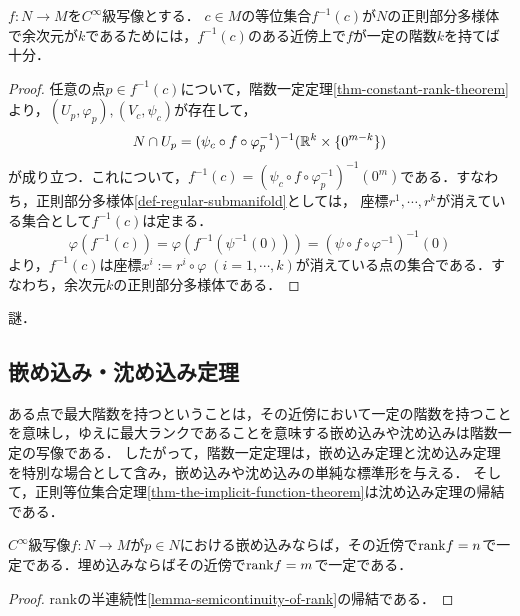 \documentclass[uplatex,dvipdfmx]{jsreport}
\begin{document}
\begin{theorem}\label{thm-constant-rank-level-set-theorem}
    $f:N\to M$を$C^\infty$級写像とする．
    $c\in M$の等位集合$f^{-1}(c)$が$N$の正則部分多様体で余次元が$k$であるためには，$f^{-1}(c)$のある近傍上で$f$が一定の階数$k$を持てば十分．
\end{theorem}
\begin{proof}
    任意の点$p\in f^{-1}(c)$について，階数一定定理\ref{thm-constant-rank-theorem}より，$(U_p,\varphi_p),(V_c,\psi_c)$が存在して，
    \[N\cap U_p=(\psi_c\circ f\circ\varphi_p^{-1})^{-1}(\mathbb{R}^k\times\{0^{m-k}\})\]
    が成り立つ．これについて，$f^{-1}(c)=(\psi_c\circ f\circ\varphi_p^{-1})^{-1}(0^m)$である．すなわち，正則部分多様体\ref{def-regular-submanifold}としては，
    座標$r^1,\cdots,r^k$が消えている集合として$f^{-1}(c)$は定まる．
    \[\varphi(f^{-1}(c))=\varphi(f^{-1}(\psi^{-1}(0)))=(\psi\circ f\circ\varphi^{-1})^{-1}(0)\]
    より，$f^{-1}(c)$は座標$x^i:=r^i\circ\varphi\;(i=1,\cdots,k)$が消えている点の集合である．すなわち，余次元$k$の正則部分多様体である．
\end{proof}
\begin{remarks}
    謎．
\end{remarks}

\subsection{嵌め込み・沈め込み定理}

\begin{tcolorbox}[colframe=ForestGreen, colback=ForestGreen!10!white,breakable,colbacktitle=ForestGreen!40!white,coltitle=black,fonttitle=\bfseries\sffamily,
title=]
    ある点で最大階数を持つということは，その近傍において一定の階数を持つことを意味し，ゆえに最大ランクであることを意味する嵌め込みや沈め込みは階数一定の写像である．
    したがって，階数一定定理は，嵌め込み定理と沈め込み定理を特別な場合として含み，嵌め込みや沈め込みの単純な標準形を与える．
    そして，正則等位集合定理\ref{thm-the-implicit-function-theorem}は沈め込み定理の帰結である．
\end{tcolorbox}

\begin{lemma}
    $C^\infty$級写像$f:N\to M$が$p\in N$における嵌め込みならば，その近傍で$\mathrm{rank} f=n$で一定である．埋め込みならばその近傍で$\mathrm{rank} f=m$で一定である．
\end{lemma}
\begin{proof}
    rankの半連続性\ref{lemma-semicontinuity-of-rank}の帰結である．
\end{proof}
\end{document}
